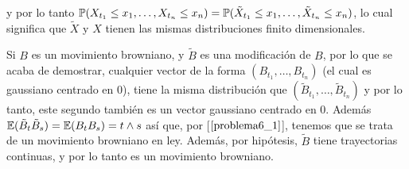y por lo tanto $\P(X_{t_1} \leq x_1, \dots, X_{t_n} \leq x_n) = \P( \tilde X_{t_1} \leq x_1, \dots, \tilde X_{t_n} \leq x_n)$, lo 
cual significa que $\tilde X$ y $X$ tienen las mismas distribuciones finito dimensionales.\pn

Si $B$ es un movimiento browniano, y $\tilde B$ es una modificación de $B$, por lo que se acaba de demostrar, cualquier vector de
la forma $(B_{t_1}, \dots, B_{t_n})$ (el cual es gaussiano centrado en 0), tiene la misma distribución que $(\tilde B_{t_1}, \dots, \tilde B_{t_n})$ y
por lo tanto, este segundo también es un vector gaussiano centrado en 0. Además $\E(\tilde B_t \tilde B_s) = \E(B_t B_s) = t \wedge s$ así
que, por [$\ref{problema6_1}$], tenemos que se trata de un movimiento browniano en ley. Además, por hipótesis, $\tilde B$ tiene trayectorias
continuas, y por lo tanto es un movimiento browniano.